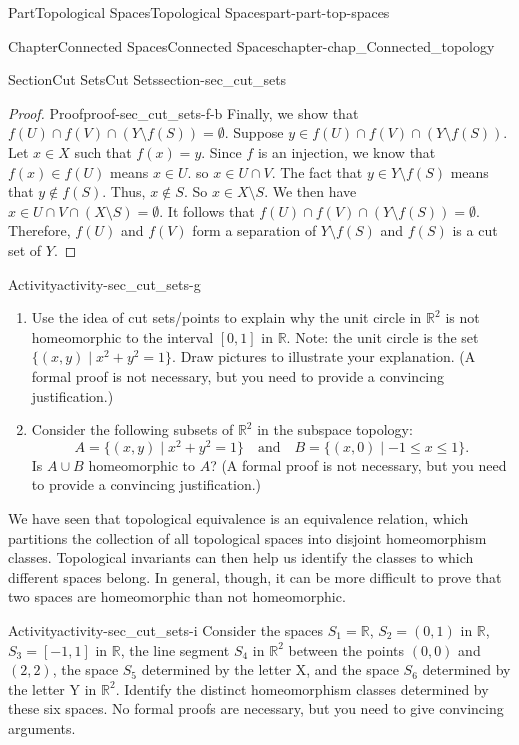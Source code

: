 \documentclass[oneside,10pt,]{book}
\numberwithin{equation}{chapter}
\newcommand{\R}{\mathbb{R}}
\begin{document}
\begin{partptx}{Part}{Topological Spaces}{}{Topological Spaces}{}{}{part-part-top-spaces}
\begin{chapterptx}{Chapter}{Connected Spaces}{}{Connected Spaces}{}{}{chapter-chap_Connected_topology}
\begin{sectionptx}{Section}{Cut Sets}{}{Cut Sets}{}{}{section-sec_cut_sets}
\begin{proof}{Proof}{}{proof-sec_cut_sets-f-b}
Finally, we show that \(f(U) \cap f(V) \cap (Y \setminus f(S)) = \emptyset\). Suppose \(y \in f(U) \cap f(V) \cap (Y \setminus f(S))\). Let \(x \in X\) such that \(f(x) = y\). Since \(f\) is an injection, we know that \(f(x) \in f(U)\) means \(x \in U\). so \(x \in U \cap V\). The fact that \(y \in Y \setminus f(S)\) means that \(y \notin f(S)\). Thus, \(x \notin S\). So \(x \in X \setminus S\). We then have \(x \in U \cap V \cap (X \setminus S) = \emptyset\). It follows that \(f(U) \cap f(V) \cap (Y \setminus f(S)) = \emptyset\). Therefore, \(f(U)\) and \(f(V)\) form a separation of \(Y \setminus f(S)\) and \(f(S)\) is a cut set of \(Y\).%
\end{proof}
\begin{activity}{Activity}{}{activity-sec_cut_sets-g}%
\begin{enumerate}[font=\bfseries,label=(\alph*),ref=\alph*]%
\item{}Use the idea of cut sets\slash{}points to explain why the unit circle in \(\R^2\) is not homeomorphic to the interval \([0,1]\) in \(\R\). Note: the unit circle is the set \(\{(x,y) \mid x^2+y^2 = 1\}\). Draw pictures to illustrate your explanation. (A formal proof is not necessary, but you need to provide a convincing justification.)%
\item{}Consider the following subsets of \(\R^2\) in the subspace topology:%
\begin{equation*}
A = \{ (x,y) \mid x^2+y^2 =1\} \ \ \ \text{ and }  \ \ \ B = \{ (x,0) \mid -1 \leq x \leq 1\}\text{.}
\end{equation*}
Is \(A \cup B\) homeomorphic to \(A\)? (A formal proof is not necessary, but you need to provide a convincing justification.)%
\end{enumerate}%
\end{activity}%
We have seen that topological equivalence is an equivalence relation, which partitions the collection of all topological spaces into disjoint homeomorphism classes. Topological invariants can then help us identify the classes to which different spaces belong. In general, though, it can be more difficult to prove that two spaces are homeomorphic than not homeomorphic.%
\begin{activity}{Activity}{}{activity-sec_cut_sets-i}%
Consider the spaces \(S_1 = \R\), \(S_2 = (0,1)\) in \(\R\), \(S_3 = [-1,1]\) in \(\R\), the line segment \(S_4\) in \(\R^2\) between the points \((0,0)\) and \((2,2)\), the space \(S_5\) determined by the letter \textbraceleft{} X\textbraceright{}, and the space \(S_6\) determined by the letter \textbraceleft{} Y\textbraceright{} in \(\R^2\). Identify the distinct homeomorphism classes determined by these six spaces. No formal proofs are necessary, but you need to give convincing arguments.%

\end{activity}
\end{sectionptx}
\end{chapterptx}
\end{partptx}
\end{document}
